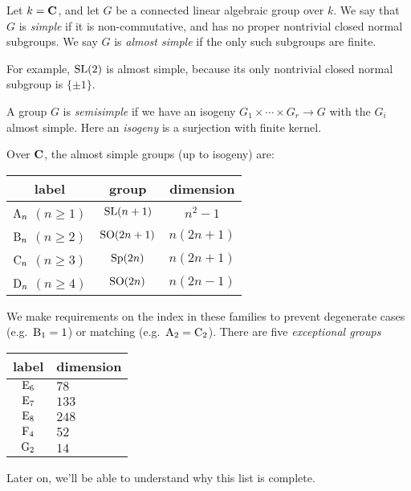 \begin{example}[Semisimple]
Let $k=\mathbf{C}$, and let $G$ be a connected linear 
algebraic group over $k$. We say that $G$ is \emph{simple} if it is 
non-commutative, and has no proper nontrivial closed normal subgroups. We say 
$G$ is \emph{almost simple} if the only such subgroups are finite. 

For example, $\operatorname{SL}(2)$ is almost simple, because its only nontrivial 
closed normal subgroup is $\{\pm 1\}$. 

A group $G$ is \emph{semisimple} if we have an isogeny 
$G_1\times \cdots \times G_r\to G$ with the $G_i$ almost simple. Here an 
\emph{isogeny} is a surjection with finite kernel. 
\end{example}

Over $\mathbf{C}$, the almost simple groups (up to isogeny) are: 
\begin{center}
\begin{tabular}{c|c|c}
label & group & dimension \\ \hline
$\mathrm{A}_n$ $(n\geqslant 1)$ & $\operatorname{SL}(n+1)$ & $n^2-1$ \\
$\mathrm{B}_n$ $(n\geqslant 2)$ & $\operatorname{SO}(2n+1)$ & $n(2n+1)$\\
$\mathrm{C}_n$ $(n\geqslant 3)$ & $\operatorname{Sp}(2n)$ & $n(2n+1)$ \\
$\mathrm{D}_n$ $(n\geqslant 4)$ & $\operatorname{SO}(2n)$ & $n(2n-1)$
\end{tabular}
\end{center}
We make requirements on the index in these families to prevent degenerate 
cases (e.g.~$\mathrm{B}_1=1$) or matching (e.g.~$\mathrm{A}_2=\mathrm{C}_2$). There are 
five \emph{exceptional groups} 
\begin{center}
\begin{tabular}{c|l}
label & dimension \\ \hline
$\mathrm{E}_6$ & $78$ \\
$\mathrm{E}_7$ & $133$ \\
$\mathrm{E}_8$ & $248$ \\
$\mathrm{F}_4$ & $52$ \\
$\mathrm{G}_2$ & $14$
\end{tabular}
\end{center}
Later on, we'll be able to understand why this list is complete.
